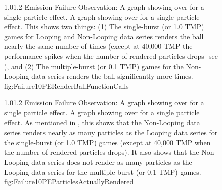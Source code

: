 \begin{figure}
\addtocounter{figure}{-1}

	\vspace{-1.6cm}
	{1.0}{1.2}
	{Emission Failure Observation: A graph showing  over  for a single particle effect.}
	{A graph showing  over  for a single particle effect. This shows two things: (1) The single-burst (or 1.0 TMP) games for Looping and Non-Looping data series renders the ball nearly the same number of times (except at 40,000 TMP the performance spikes when the number of rendered particles drops- see ), and (2) The multiple-burst (or 0.1 TMP) games for the Non-Looping data series renders the ball significantly more times.}
	{fig:Failure10PERenderBallFunctionCalls}

	\vspace{-0.6cm}
	{1.0}{1.2}
	{Emission Failure Observation: A graph showing  over  for a single particle effect.}
	{A graph showing  over  for a single particle effect. As mentioned in , this shows that the Non-Looping data series renders nearly as many particles as the Looping data series for the single-burst (or 1.0 TMP) games (except at 40,000 TMP when the number of rendered particles drops). It also shows that the Non-Looping data series does not render as many particles as the Looping data series for the multiple-burst (or 0.1 TMP) games.}
	{fig:Failure10PEParticlesActuallyRendered}

\end{figure}

